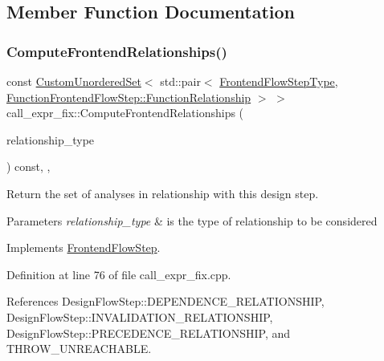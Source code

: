 \subsection{Member Function Documentation}
\mbox{\label{classcall__expr__fix_a41375743516dfd715cdc33c8b6b59fd2}} 
\subsubsection{\texorpdfstring{Compute\+Frontend\+Relationships()}{ComputeFrontendRelationships()}}
{\footnotesize\ttfamily const \hyperlink{classCustomUnorderedSet}{Custom\+Unordered\+Set}$<$ std\+::pair$<$ \hyperlink{frontend__flow__step_8hpp_afeb3716c693d2b2e4ed3e6d04c3b63bb}{Frontend\+Flow\+Step\+Type}, \hyperlink{classFrontendFlowStep_af7cf30f2023e5b99e637dc2058289ab0}{Function\+Frontend\+Flow\+Step\+::\+Function\+Relationship} $>$ $>$ call\+\_\+expr\+\_\+fix\+::\+Compute\+Frontend\+Relationships (\begin{DoxyParamCaption}\item[{const \hyperlink{classDesignFlowStep_a723a3baf19ff2ceb77bc13e099d0b1b7}{Design\+Flow\+Step\+::\+Relationship\+Type}}]{relationship\+\_\+type }\end{DoxyParamCaption}) const\hspace{0.3cm}{\ttfamily [override]}, {\ttfamily [private]}, {\ttfamily [virtual]}}



Return the set of analyses in relationship with this design step. 


\begin{DoxyParams}{Parameters}
{\em relationship\+\_\+type} & is the type of relationship to be considered \\
\hline
\end{DoxyParams}


Implements \hyperlink{classFrontendFlowStep_abeaff70b59734e462d347ed343dd700d}{Frontend\+Flow\+Step}.



Definition at line 76 of file call\+\_\+expr\+\_\+fix.\+cpp.



References Design\+Flow\+Step\+::\+D\+E\+P\+E\+N\+D\+E\+N\+C\+E\+\_\+\+R\+E\+L\+A\+T\+I\+O\+N\+S\+H\+IP, Design\+Flow\+Step\+::\+I\+N\+V\+A\+L\+I\+D\+A\+T\+I\+O\+N\+\_\+\+R\+E\+L\+A\+T\+I\+O\+N\+S\+H\+IP, Design\+Flow\+Step\+::\+P\+R\+E\+C\+E\+D\+E\+N\+C\+E\+\_\+\+R\+E\+L\+A\+T\+I\+O\+N\+S\+H\+IP, and T\+H\+R\+O\+W\+\_\+\+U\+N\+R\+E\+A\+C\+H\+A\+B\+LE.

